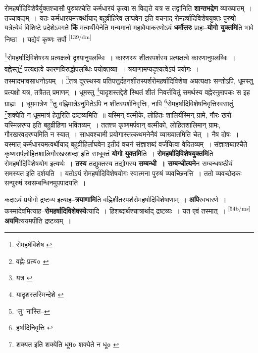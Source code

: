 \documentclass[article,12pt,a4paper]{memoir}
\begin{document}
	  \pstart रोमहर्षादिविशेषैर्युक्तश्चासौ पुरुषश्चेति कर्मधारयं कृत्वा स विद्यते यत्र स तद्वानिति \textbf{शान्तभद्रेण} व्याख्यातम् । तच्चावद्यम् । यतः कर्मधारयमत्त्वर्थीयाद् बहुव्रीहिरेव लाघवेन इति वचनाद् रोमहर्षादिविशेषयुक्तः पुरुषो यत्रेत्येवं विशिष्टे प्रदेशेऽवगते \textbf{किं} मत्वर्थीयेनेति मन्यमानो महावैयाकरणोऽयं \textbf{धर्मोत्तरः} प्राहः--\textbf{योगो युक्तमि}ति भावे निष्ठा । यद्येवं कृष्णः सर्पो  \leavevmode\textsuperscript{\rmlatinfont\tiny [139/dm]} 
	  
	\footnote{रोमहर्षविशेष \cite{dp-msD} \cite{dp-msB}}रोमहर्षादिविशेषस्य प्रत्यक्षत्वे दृश्यानुपलब्धिः । कारणस्य शीतस्पर्शस्य प्रत्यक्षत्वे कारणानुपलब्धिः । वह्नेस्तु\footnote{वह्नेः प्रत्य० \cite{dp-msC} \cite{dp-msD}} प्रत्यक्षत्वे कारणविरुद्धोपलब्धिः प्रयोक्तव्या । त्रयाणामप्यदृश्यत्वेऽयं प्रयोगः । तस्मादभावसाधनोऽयम् । \footnote{यत्र \cite{dp-msA}}तत्र दूरस्थस्य प्रतिपत्तुर्दहनशीतस्पर्शरोमहर्षादिविशेषा अप्रत्यक्षाः सन्तोऽपि, धूमस्तु प्रत्यक्षो यत्र, तत्रैतत् प्रमाणम् । धूमस्तु \footnote{यादृशस्तस्मिन्देशे \cite{dp-msA} \cite{dp-msC} \cite{dp-edP} \cite{dp-edH} \cite{dp-edE} \cite{dp-edN}}यादृशस्तद्देशे स्थितं शीतं निवर्त्तयितुं समर्थस्य वह्नेरनुमापकः स इह ग्राह्यः । धूममात्रेण \footnote{‘तु’ नास्ति--\cite{dp-msA}}तु वह्निमात्रेऽनुमितेऽपि न शीतस्पर्शनिवृत्तिः, नापि \footnote{हर्षादिनिवृत्ति \cite{dp-msD} \cite{dp-msB}}रोमहर्षादिविशेषनिवृत्तिरवसातुं \footnote{शक्यत इति \cite{dp-msC} शक्येति धूम० \cite{dp-msA} शक्येते न धू० \cite{dp-edH}}शक्येति न धूममात्रं हेतुरिति द्रष्टव्यमिति ॥ यस्मिन् वल्मीके, लोहितः शालिर्यस्मिन् ग्रामे, गौरः खरो यस्मिन्नरण्य इति बहुव्रीहिणा भवितव्यम् । ततश्च कृष्णमर्पवान् वल्मीको, लोहितशालिमान् ग्रामः, गौरखरवदरण्यमिति न स्यात् । साधवश्चामी प्रयोगास्तत्कथमनेनैवं व्याख्यातमिति चेत् । नैष दोषः । यस्मात् कर्मधारयमत्वर्थीयाद् बहुव्रीहिर्लाघवेन इतीदं वचनं संज्ञाशब्दं वर्जयित्वा वेदितव्यम् । संज्ञाशब्दाश्चैते कृष्णसर्पलोहितशालिगौरखरशब्दा इति साधूक्तं \textbf{योगो युक्तमि}ति । \textbf{रोमहर्षादिविशेषयुक्तमि}ति रोमहर्षादिविशेषयोग इत्यर्थः । \textbf{तस्य} तद्युक्तस्य तद्योगस्य \textbf{सम्बन्धी । सम्बन्धीत्यने}न सम्बन्धषष्ठीयं समस्यत इति दर्शयति । यतोऽयं रोमहर्षादिविशेषयोगः स्वात्मना पुरुषं व्यवच्छिनत्ति । ततो व्यवच्छेदकः सन्पुरुषं स्वसम्बन्धिनमुपपादयति ।
	\pend
      

	  \pstart कदाऽयं प्रयोगो द्रष्टव्य इत्याह--\textbf{त्रयाणामि}ति वह्निशीतस्पर्शरोमहर्षादिविशेषाणाम् । \textbf{अपि}रवधारणे । कस्मादेवमित्याह--\textbf{रोमहर्षादिविशेषस्ये}त्यादि । हिशब्दार्थश्चात्रार्थाद् द्रष्टव्यः । यत एवं तस्मात् । \leavevmode\textsuperscript{\rmlatinfont\tiny [54b/ms]} \textbf{अयमि}त्ययमपीति द्रष्टव्यम् ।
	\pend
      
\end{document}
